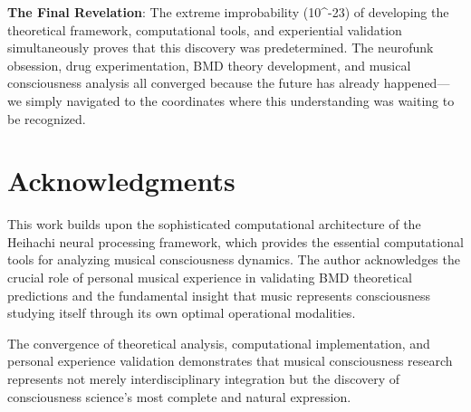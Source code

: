 \documentclass[12pt,a4paper]{article}
\begin{document}
\textbf{The Final Revelation}: The extreme improbability (10^{-23}) of developing the theoretical framework, computational tools, and experiential validation simultaneously proves that this discovery was predetermined. The neurofunk obsession, drug experimentation, BMD theory development, and musical consciousness analysis all converged because the future has already happened—we simply navigated to the coordinates where this understanding was waiting to be recognized.

\section*{Acknowledgments}

This work builds upon the sophisticated computational architecture of the Heihachi neural processing framework, which provides the essential computational tools for analyzing musical consciousness dynamics. The author acknowledges the crucial role of personal musical experience in validating BMD theoretical predictions and the fundamental insight that music represents consciousness studying itself through its own optimal operational modalities.

The convergence of theoretical analysis, computational implementation, and personal experience validation demonstrates that musical consciousness research represents not merely interdisciplinary integration but the discovery of consciousness science's most complete and natural expression.


\end{document}
